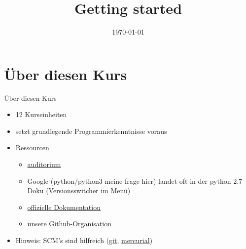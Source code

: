 


\newcommand{\topic}{
	Getting started
}

\title{\topic}
\supertitle{\course}
\date{\today}



\maketitle

\begin{frame}
	\tableofcontents
\end{frame}


\section{Über diesen Kurs}
\begin{frame}{Über diesen Kurs}
	\begin{itemize}
    	\item 12 Kurseinheiten
    	\item setzt grundlegende Programmierkenntnisse voraus
    	\item Ressourcen
    	\begin{itemize}
    	    \item \href{http://auditorium.inf.tu-dresden.de}{auditorium} %
	        \item Google (python/python3 meine frage hier) landet oft in der python 2.7 Doku (Versionsswitcher im Menü)
    	    \item \href{docs.python.org}{offizielle Dokumentation}
    	    \item unsere \href{https://github.com/fsr}{Github-Organisation}
    	\end{itemize}
    	\item Hinweis: SCM's sind hilfreich (\href{https://git-scm.com}{git}, \href{http://mercurial.selenic.com/}{mercurial})
	\end{itemize}
\end{frame}

